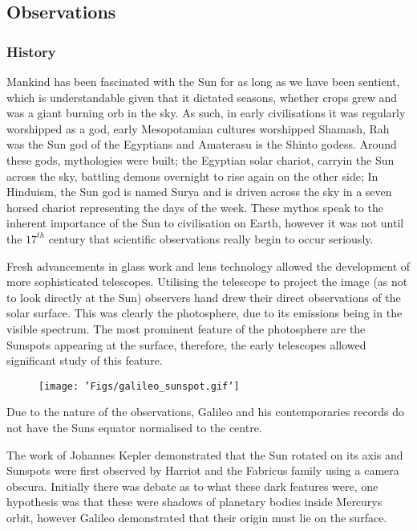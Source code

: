 \subsection{Observations}

\subsubsection{History}
Mankind has been fascinated with the Sun for as long as we have been sentient, which is understandable given that it dictated seasons, whether crops grew and was a giant burning orb in the sky.
As such, in early civilisations it was regularly worshipped as a god, early Mesopotamian cultures worshipped Shamash, Rah was the Sun god of the Egyptians and Amaterasu is the Shinto godess.
Around these gods, mythologies were built; the Egyptian solar chariot, carryin the Sun across the sky, battling demons overnight to rise again on the other side; In Hinduism, the Sun god is named Surya and is driven across the sky in a seven horsed chariot representing the days of the week.
These mythos speak to the inherent importance of the Sun to civilisation on Earth, however it was not until the $17^{th}$ century that scientific observations really begin to occur seriously.


Fresh advancements in glass work and lens technology allowed the development of more sophisticated telescopes.
Utilising the telescope to project the image (as not to look directly at the Sun) observers hand drew their direct observations of the solar surface.
This was clearly the photosphere, due to its emissions being in the visible spectrum. 
The most prominent feature of the photosphere are the Sunspots appearing at the surface, therefore, the early telescopes allowed significant study of this feature.

\begin{figure}
	\texttt{[image: 'Figs/galileo\_sunspot.gif']}
	\label{fig:gali_sp}
\end{figure}

Due to the nature of the observations, Galileo and his contemporaries records do not have the Suns equator normalised to the centre. 

The work of Johannes Kepler demonstrated that the Sun rotated on its axis and Sunspots were first observed by Harriot and the Fabricus family using a camera obscura. 
Initially there was debate as to what these dark features were, one hypothesis was that these were shadows of planetary bodies inside Mercurys orbit, however Galileo demonstrated that their origin must lie on the surface.

